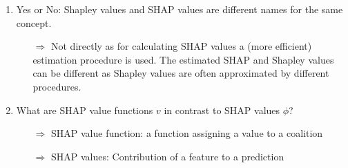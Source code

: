 \begin{enumerate}
\begin{itemize}
	\end{itemize}
    \item Yes or No: Shapley values and SHAP values are different names for the same concept.
    \begin{itemize}
    	\item[$\Rightarrow$] Not directly as for calculating SHAP values a (more efficient) estimation procedure is used. The estimated SHAP and Shapley values can be different as Shapley values are often approximated by different procedures.
    \end{itemize}
    \item What are SHAP value functions $v$ in contrast to SHAP values $\phi$?
    \begin{itemize}
    	\item[$\Rightarrow$] SHAP value function: a function assigning a value to a coalition
    	\item[$\Rightarrow$] SHAP values: Contribution of a feature to a prediction
    \end{itemize}
\end{enumerate}
